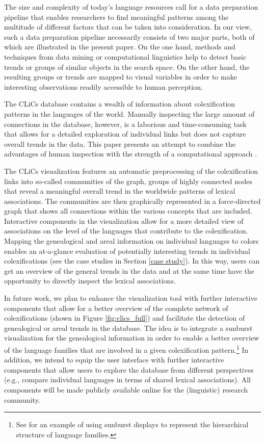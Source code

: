 \documentclass[10pt, a4paper]{article}
\begin{document}
The size and complexity of today's language resources call for a data preparation pipeline that enables researchers to find meaningful patterns among the multitude of different factors that can be taken into consideration. In our view, such a data preparation pipeline necessarily consists of two major parts, both of which are illustrated in the present paper. On the one hand, methods and techniques from data mining or computational linguistics help to detect basic trends or groups of similar objects in the search space. On the other hand, the resulting groups or trends are mapped to visual variables in order to make interesting observations readily accessible to human perception. 

The CLiCs database contains a wealth of information about colexification patterns in the languages of the world. Manually inspecting the large amount of connections in the database, however, is a laborious and time-consuming task that allows for a detailed exploration of individual links but does not capture overall trends in the data. This paper presents an attempt to combine the advantages of human inspection with the strength of a computational approach \cite{Keim2008}. 

The CLiCs visualization features an automatic preprocessing of the colexification links into so-called communities of the graph, groups of highly connected nodes that reveal a meaningful overall trend in the worldwide patterns of lexical associations. The communities are then graphically represented in a force-directed graph that shows all connections within the various concepts that are included. Interactive components in the visualization allow for a more detailed view of associations on the level of the languages that contribute to the colexification. 
Mapping the genealogical and areal information on individual languages to colors enables an at-a-glance evaluation of potentially interesting trends in individual colexifications (see the case studies in Section \ref{case study}). 
In this way, users can get an overview of the general trends in the data and at the same time have the opportunity to directly inspect the lexical associations. 

In future work, we plan to enhance the visualization tool with further interactive components that allow for a better overview of the complete network of colexifications (shown in Figure \ref{fig:clics_full}) and facilitate the detection of genealogical or areal trends in the database. The idea is to integrate a sunburst visualization \cite{Sunburst}  for the genealogical information in order to enable a better overview of the language families that are involved in a given colexification pattern.\footnote{See  for an example of using sunburst displays to represent the hierarchical structure of language families.} In addition, we intend to equip the user interface with further interactive components that allow users to explore the database from different perspectives (e.g., compare individual languages in terms of shared lexical associations). All components will be made publicly available online for the (linguistic) research community. 
\end{document}
